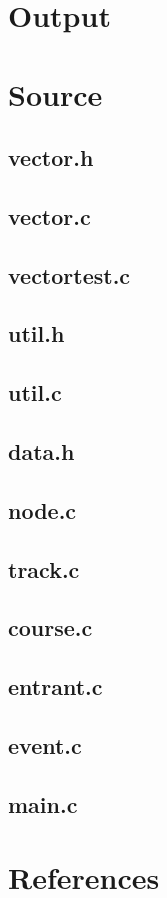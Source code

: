 \documentclass[a4paper, twoside]{article}
\begin{document}
\section{Output}

\section{Source}
\subsection{vector.h}

\subsection{vector.c}

\subsection{vectortest.c}

\subsection{util.h}

\subsection{util.c}

\subsection{data.h}

\subsection{node.c}

\subsection{track.c}

\subsection{course.c}

\subsection{entrant.c}

\subsection{event.c}

\subsection{main.c}


\section{References}
\end{document}
